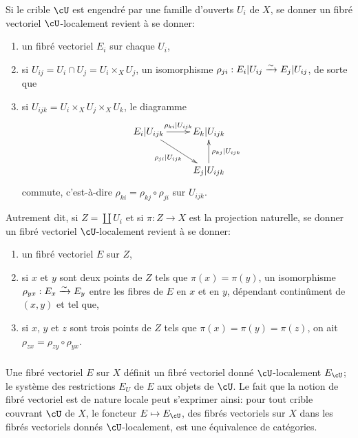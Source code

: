 Si le crible $\cU$ est engendré par une famille d'ouverts $U_i$ de $X$, se 
donner un fibré vectoriel $\cU$-localement revient à se donner:
\begin{enumerate}[\indent a)]
  \item un fibré vectoriel $E_i$ sur chaque $U_i$, 
  \item si $U_{ij} = U_i\cap U_j = U_i\times_X U_j$, un isomorphisme 
    $\rho_{ji} : E_i|U_{ij} \xrightarrow\sim E_j|U_{ij}$, de sorte que 
  \item si $U_{ijk} = U_i\times_X U_j\times_X U_k$, le diagramme 
    \[\xymatrix{
      E_i |U_{ijk} \ar[r]^-{\rho_{ki}|U_{ijk}} \ar[dr]_-{\rho_{ji}|U_{ijk}} 
        & E_k|U_{ijk} \\
      & E_j|U_{ijk} \ar[u]_-{\rho_{kj}|U_{ijk}}
    }\]
    commute, c'est-à-dire $\rho_{ki} = \rho_{kj}\circ \rho_{ji}$ sur 
    $U_{ijk}$. 
\end{enumerate}

Autrement dit, si $Z=\coprod U_i$ et si $\pi:Z\to X$ est la projection 
naturelle, se donner un fibré vectoriel $\cU$-localement revient à se donner: 
\begin{enumerate}[\indent a)]
  \item un fibré vectoriel $E$ sur $Z$, 
  \item si $x$ et $y$ sont deux points de $Z$ tels que $\pi(x) = \pi(y)$, un 
    isomorphisme $\rho_{y x}:E_x\xrightarrow\sim E_y$ entre les fibres de $E$ en $x$ et en 
    $y$, dépendant continûment de $(x,y)$ et tel que, 
  \item si $x$, $y$ et $z$ sont trois points de $Z$ tels que 
  $\pi(x)=\pi(y)=\pi(z)$, on ait $\rho_{zx} = \rho_{zy}\circ \rho_{yx}$. 
\end{enumerate}





\subsubsection{}\label{I:1-3-3}

Une fibré vectoriel $E$ sur $X$ définit un fibré vectoriel donné 
$\cU$-localement $E_\cU$; le système des restrictions $E_U$ de $E$ aux objets 
de $\cU$. Le fait que la notion de fibré vectoriel est de nature locale peut 
s'exprimer ainsi: pour tout crible couvrant $\cU$ de $X$, le foncteur 
$E\mapsto E_\cU$, des fibrés vectoriels sur $X$ dans les fibrés vectoriels 
donnés $\cU$-localement, est une équivalence de catégories. 





